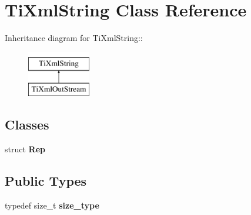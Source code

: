 \hypertarget{class_ti_xml_string}{
\section{TiXmlString Class Reference}
\label{class_ti_xml_string}
}
Inheritance diagram for TiXmlString::\begin{figure}[H]
\begin{center}
\leavevmode
\includegraphics[height=2cm]{class_ti_xml_string}
\end{center}
\end{figure}
\subsection*{Classes}
\begin{DoxyCompactItemize}
\item 
struct {\bfseries Rep}
\end{DoxyCompactItemize}
\subsection*{Public Types}
\begin{DoxyCompactItemize}
\item 
\hypertarget{class_ti_xml_string_abeb2c1893a04c17904f7c06546d0b971}{
typedef size\_\-t {\bfseries size\_\-type}}
\label{class_ti_xml_string_abeb2c1893a04c17904f7c06546d0b971}

\end{DoxyCompactItemize}
